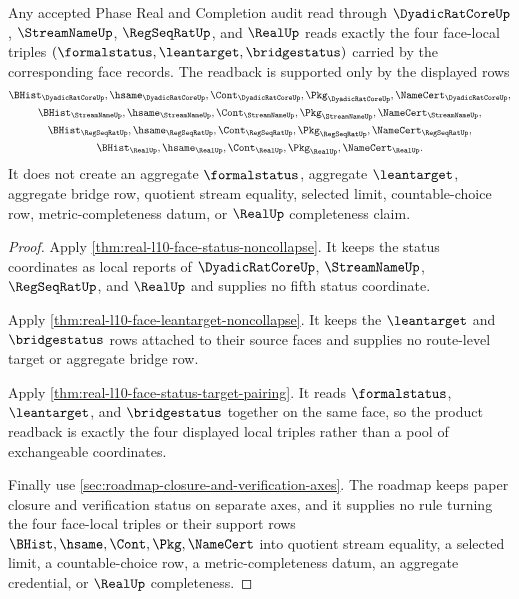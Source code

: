 \begin{theorem}
\label{thm:real-l10-face-status-product-readback}
Any accepted Phase Real and Completion audit read through
$\DyadicRatCoreUp$, $\StreamNameUp$, $\RegSeqRatUp$, and $\RealUp$ reads
exactly the four face-local triples
$(\formalstatus,\leantarget,\bridgestatus)$ carried by the corresponding face
records. The readback is supported only by the displayed rows
$$
\begin{gathered}
\BHist_{\DyadicRatCoreUp},\hsame_{\DyadicRatCoreUp},\Cont_{\DyadicRatCoreUp},
\Pkg_{\DyadicRatCoreUp},\NameCert_{\DyadicRatCoreUp},\\
\BHist_{\StreamNameUp},\hsame_{\StreamNameUp},\Cont_{\StreamNameUp},
\Pkg_{\StreamNameUp},\NameCert_{\StreamNameUp},\\
\BHist_{\RegSeqRatUp},\hsame_{\RegSeqRatUp},\Cont_{\RegSeqRatUp},
\Pkg_{\RegSeqRatUp},\NameCert_{\RegSeqRatUp},\\
\BHist_{\RealUp},\hsame_{\RealUp},\Cont_{\RealUp},
\Pkg_{\RealUp},\NameCert_{\RealUp}.
\end{gathered}
$$
It does not create an aggregate $\formalstatus$, aggregate $\leantarget$,
aggregate bridge row, quotient stream equality, selected limit,
countable-choice row, metric-completeness datum, or $\RealUp$ completeness
claim.
\end{theorem}
\begin{proof}
Apply \autoref{thm:real-l10-face-status-noncollapse}. It keeps the status
coordinates as local reports of $\DyadicRatCoreUp$, $\StreamNameUp$,
$\RegSeqRatUp$, and $\RealUp$ and supplies no fifth status coordinate.

Apply \autoref{thm:real-l10-face-leantarget-noncollapse}. It keeps the
$\leantarget$ and $\bridgestatus$ rows attached to their source faces and
supplies no route-level target or aggregate bridge row.

Apply \autoref{thm:real-l10-face-status-target-pairing}. It reads
$\formalstatus$, $\leantarget$, and $\bridgestatus$ together on the same face,
so the product readback is exactly the four displayed local triples rather
than a pool of exchangeable coordinates.

Finally use \autoref{sec:roadmap-closure-and-verification-axes}. The roadmap
keeps paper closure and verification status on separate axes, and it supplies
no rule turning the four face-local triples or their support rows
$\BHist,\hsame,\Cont,\Pkg,\NameCert$ into quotient stream equality, a selected
limit, a countable-choice row, a metric-completeness datum, an aggregate
credential, or $\RealUp$ completeness.
\end{proof}


